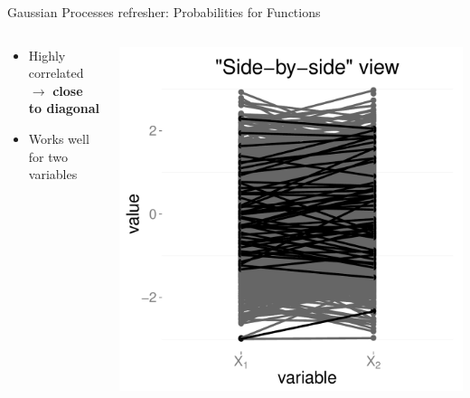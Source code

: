 \documentclass[final,t]{beamer}\usepackage[]{graphicx}\usepackage[]{color}
\makeatletter
\def\maxwidth{ %
  \ifdim\Gin@nat@width>\linewidth
    \linewidth
  \else
    \Gin@nat@width
  \fi
}
\newenvironment{knitrout}{}{} %
\makeatother
\begin{document}
\begin{frame}[fragile]
\begin{block}{Gaussian Processes refresher: Probabilities for Functions}
\begin{columns}[T]
\begin{column}{0.12\linewidth}
\begin{knitrout}
\end{knitrout}

        \tiny
        \begin{itemize} \scriptsize
          \item Highly correlated $\rightarrow$ \textbf{close to diagonal}
          \item Works well for two variables
        \end{itemize}
      \end{column}
      \begin{column}{0.12\linewidth}
\begin{knitrout}
\color{fgcolor}
\includegraphics[width=\maxwidth]{figure/side_by_side} 

\end{knitrout}


\end{column}
\end{columns}
\end{block}
\end{frame}
\end{document}
